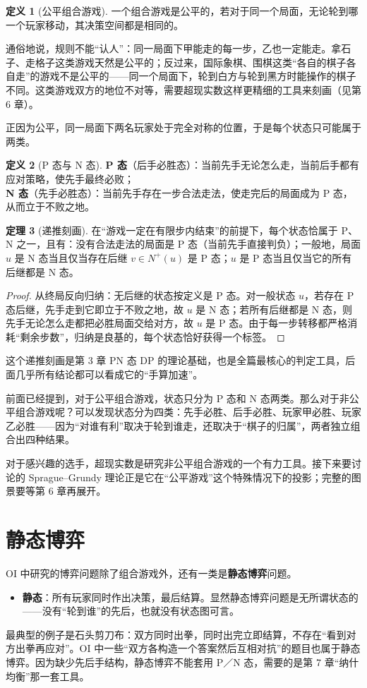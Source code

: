 \documentclass[UTF8,a4paper,11pt,oneside,openany,fontset=fandol]{ctexbook}
\theoremstyle{definition}
\newtheorem{definition}{定义}[chapter]
\newtheorem{theorem}[definition]{定理}
\newcommand{\Np}{N^+}
\begin{document}
\begin{definition}[公平组合游戏]
一个组合游戏是公平的，若对于同一个局面，无论轮到哪一个玩家移动，其决策空间都是相同的。
\end{definition}

通俗地说，规则不能“认人”：同一局面下甲能走的每一步，乙也一定能走。拿石子、走格子这类游戏天然是公平的；反过来，国际象棋、围棋这类“各自的棋子各自走”的游戏不是公平的——同一个局面下，轮到白方与轮到黑方时能操作的棋子不同。这类游戏双方的地位不对等，需要超现实数这样更精细的工具来刻画（见第 6 章）。

正因为公平，同一局面下两名玩家处于完全对称的位置，于是每个状态只可能属于两类。

\begin{definition}[P 态与 N 态]\label{def:pn}
\textbf{P 态}（后手必胜态）：当前先手无论怎么走，当前后手都有应对策略，使先手最终必败；\\
\textbf{N 态}（先手必胜态）：当前先手存在一步合法走法，使走完后的局面成为 P 态，从而立于不败之地。
\end{definition}

\begin{theorem}[递推刻画]\label{thm:recursion}
在“游戏一定在有限步内结束”的前提下，每个状态恰属于 P、N 之一，且有：没有合法走法的局面是 P 态（当前先手直接判负）；一般地，局面 $u$ 是 N 态当且仅当存在后继 $v\in\Np(u)$ 是 P 态；$u$ 是 P 态当且仅当它的所有后继都是 N 态。
\end{theorem}
\begin{proof}
从终局反向归纳：无后继的状态按定义是 P 态。对一般状态 $u$，若存在 P 态后继，先手走到它即立于不败之地，故 $u$ 是 N 态；若所有后继都是 N 态，则先手无论怎么走都把必胜局面交给对方，故 $u$ 是 P 态。由于每一步转移都严格消耗“剩余步数”，归纳是良基的，每个状态恰好获得一个标签。
\end{proof}

这个递推刻画是第 3 章 PN 态 DP 的理论基础，也是全篇最核心的判定工具，后面几乎所有结论都可以看成它的“手算加速”。

前面已经提到，对于公平组合游戏，状态只分为 P 态和 N 态两类。那么对于非公平组合游戏呢？可以发现状态分为四类：先手必胜、后手必胜、玩家甲必胜、玩家乙必胜——因为“对谁有利”取决于轮到谁走，还取决于“棋子的归属”，两者独立组合出四种结果。

对于感兴趣的选手，超现实数是研究非公平组合游戏的一个有力工具。接下来要讨论的 Sprague--Grundy 理论正是它在“公平游戏”这个特殊情况下的投影；完整的图景要等第 6 章再展开。

\section{静态博弈}
OI 中研究的博弈问题除了组合游戏外，还有一类是\textbf{静态博弈}问题。
\begin{itemize}
\item \textbf{静态}：所有玩家同时作出决策，最后结算。显然静态博弈问题是无所谓状态的——没有“轮到谁”的先后，也就没有状态图可言。
\end{itemize}
最典型的例子是石头剪刀布：双方同时出拳，同时出完立即结算，不存在“看到对方出拳再应对”。OI 中一些“双方各构造一个答案然后互相对抗”的题目也属于静态博弈。因为缺少先后手结构，静态博弈不能套用 P／N 态，需要的是第 7 章“纳什均衡”那一套工具。
\end{document}
